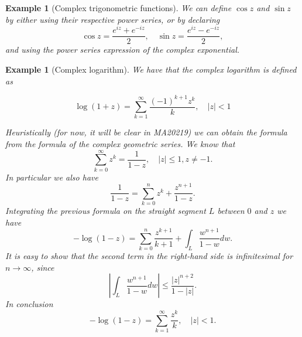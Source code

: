 \documentclass[a4paper,reqno]{amsart}
\numberwithin{equation}{section}
\newtheorem{example}[definition]{Example}
\begin{document}
\begin{example}[Complex trigonometric functions]
We can define $\cos z$ and $\sin z$ by either using their respective power series, or by declaring 
$$
\cos z= \frac{e^{iz} + e^{-iz}}{2}, \quad \sin z= \frac{e^{iz} - e^{-iz}}{2},
$$
and using the power series expression of the complex exponential.
\end{example}


\begin{example}[Complex logarithm]
We have that the complex logarithm is defined as

$$
\log(1+z) = \sum_{k=1}^{\infty} \frac{(-1)^{k+1}z^{k}}{k}, \quad |z|<1
$$

Heuristically (for now, it will be clear in MA20219) we can obtain the formula from the formula of the complex geometric series.
We know that 
$$
\sum_{k=0}^\infty z^k = \frac{1}{1-z}, \quad |z|\le1, z\neq -1.
$$
In particular we also have 
$$
\frac{1}{1-z} = \sum_{k=0}^n z^k + \frac{z^{n+1}}{1-z}.
$$
Integrating the previous formula on the straight segment $L$ between $0$ and $z$ we have 
$$
-\log(1-z) = \sum_{k=0}^n \frac{z^{k+1}}{k+1} + \int_L\frac{w^{n+1}}{1-w} dw.
$$
It is easy to show that the second term in the right-hand side is infinitesimal for $n\to \infty$, since 
$$
\left|\int_L\frac{w^{n+1}}{1-w} dw\right|\leq \frac{|z|^{n+2}}{1-|z|}.
$$
In conclusion
$$
-\log(1-z) = \sum_{k=1}^{\infty} \frac{z^{k}}{k}, \quad |z|<1.
$$
\end{example}






\end{document}
